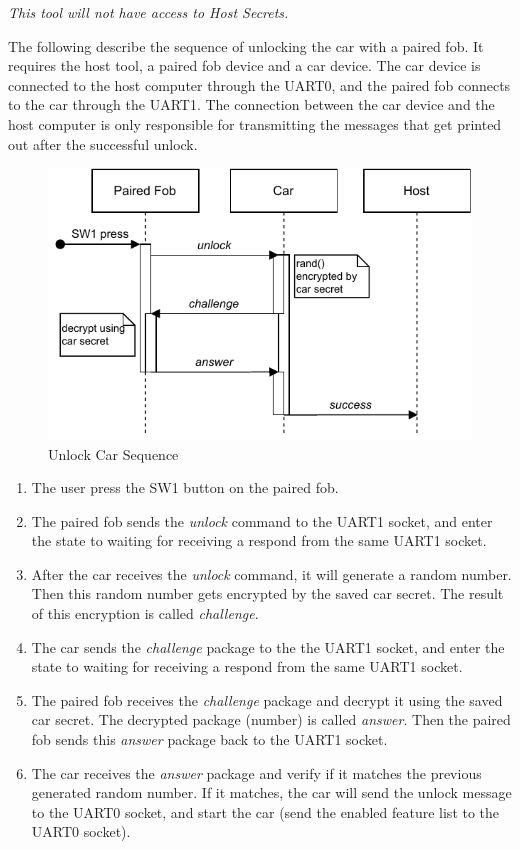 \documentclass[11pt,oneside,onecolumn,letterpaper]{article}
\begin{document}
\textit{This tool will not have access to Host Secrets.}

The following describe the sequence of unlocking the car with a paired fob. It requires the host tool, a paired fob device and a car device. The car device is connected to the host computer through the UART0, and the paired fob connects to the car through the UART1. The connection between the car device and the host computer is only responsible for transmitting the messages that get printed out after the successful unlock.

\begin{figure}[!htbp]
	\begin{centering}
		\includegraphics[width = .6\textwidth]{pic/unlock.pdf}
		\caption{Unlock Car Sequence}
		\label{fig:unlock}
	\end{centering}
\end{figure}

\begin{enumerate}
	\item The user press the SW1 button on the paired fob.
	\item The paired fob sends the \textit{unlock} command to the UART1 socket, and enter the state to waiting for receiving a respond from the same UART1 socket.
	\item After the car receives the \textit{unlock} command, it will generate a random number. Then this random number gets encrypted by the saved car secret. The result of this encryption is called \textit{challenge}.
	\item The car sends the \textit{challenge} package to the the UART1 socket, and enter the state to waiting for receiving a respond from the same UART1 socket.
	\item The paired fob receives the \textit{challenge} package and decrypt it using the saved car secret. The decrypted package (number) is called \textit{answer}. Then the paired fob sends this \textit{answer} package back to the UART1 socket.
	\item The car receives the \textit{answer} package and verify if it matches the previous generated random number. If it matches, the car will send the unlock message to the UART0 socket, and start the car (send the enabled feature list to the UART0 socket).
\end{enumerate}
\end{document}
